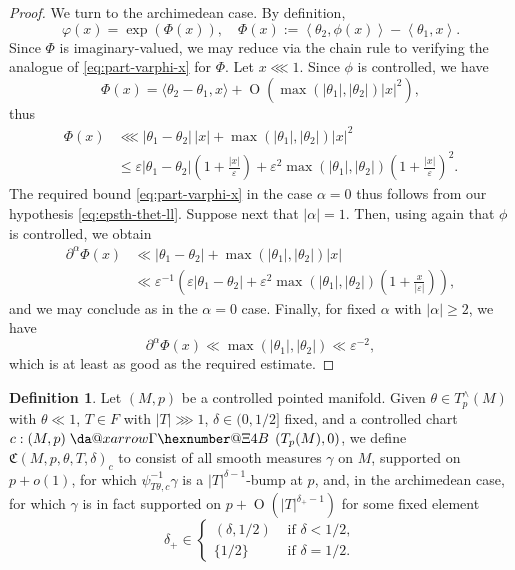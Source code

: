 \documentclass[reqno]{amsart}
\makeatletter
\newcommand*{\da@rightarrow}{\mathchar"0\hexnumber@\symAMSa 4B }
\newcommand*{\xdashrightarrow}[2][]{%
  \mathrel{%
    \mathpalette{\da@xarrow{#1}{#2}{}\da@rightarrow{\,}{}}{}%
  }%
}
\newcommand*{\da@xarrow}[7]{%
  \sbox0{$\ifx#7\scriptstyle\scriptscriptstyle\else\scriptstyle\fi#5#1#6\m@th$}%
  \sbox2{$\ifx#7\scriptstyle\scriptscriptstyle\else\scriptstyle\fi#5#2#6\m@th$}%
  \sbox4{$#7\dabar@\m@th$}%
  \dimen@=\wd0 %
  \ifdim\wd2 >\dimen@
    \dimen@=\wd2 %
  \fi
  \count@=2 %
  \def\da@bars{\dabar@\dabar@}%
  \@whiledim\count@\wd4<\dimen@\do{%
    \advance\count@\@ne
    \expandafter\def\expandafter\da@bars\expandafter{%
      \da@bars
      \dabar@ 
    }%
  }%
  \mathrel{#3}%
  \mathrel{%
    \mathop{\da@bars}\limits
    \ifx\\#1\\%
    \else
      _{\copy0}%
    \fi
    \ifx\\#2\\%
    \else
      ^{\copy2}%
    \fi
  }%
  \mathrel{#4}%
}
\def\eps{\varepsilon}
\def\O{\operatorname{O}}
\theoremstyle{plain} \newtheorem{theorem} {Theorem}
\theoremstyle{definition} \newtheorem{definition} [theorem] {Definition}
\theoremstyle{itplain} %
\numberwithin{equation}{section}
\numberwithin{theorem}{section}
\renewcommand{\geq}{\geqslant}
\renewcommand{\leq}{\leqslant}
\makeatother
\begin{document}
\begin{proof}
  We turn to the archimedean case.  By definition,
  \begin{equation*}
    \varphi(x) = \exp(\Phi(x)), \quad
    \Phi(x) := \left\langle \theta_2, \phi(x) \right\rangle - \left\langle \theta_1, x \right\rangle.
  \end{equation*}
  Since $\Phi$ is imaginary-valued, we may reduce via the chain rule to verifying the analogue of \eqref{eq:part-varphi-x} for $\Phi$.  Let $x \lll 1$.  Since $\phi$ is controlled, we have
  \begin{equation*}
    \Phi(x) = \langle \theta_2 - \theta_1, x \rangle + \O(\max(|\theta_1|,|\theta_2|) |x|^2),
  \end{equation*}
  thus
  \begin{align*}
    \Phi(x)
    &\lll
    | \theta_1 - \theta_2| \, |x| +
    \max(|\theta_1|, |\theta_2|) |x|^2 \\
    &\leq
    \eps | \theta_1 - \theta_2|  \left( 1 + \frac{|x|}{\eps } \right)
    +
    \eps^2 \max(|\theta_1|, |\theta_2|)
      \left( 1 + \frac{|x|}{\eps } \right)^2.
  \end{align*}
  The required bound \eqref{eq:part-varphi-x} in the case $\alpha = 0$ thus follows from our hypothesis \eqref {eq:epsth-thet-ll}.  Suppose next that $|\alpha| = 1$.  Then, using again that $\phi$ is controlled, we obtain
  \begin{align*}
    \partial^\alpha \Phi(x)
    &\ll |\theta_1 - \theta_2| + \max(|\theta_1|,|\theta_2|) |x| \\
    &\ll \eps^{-1} \left(
       \eps |\theta_1 - \theta_2| +
      \eps^2 \max(|\theta_1|,|\theta_2|) \left( 1 + \frac{x}{|\eps|} \right) \right),
  \end{align*}
  and we may conclude as in the $\alpha = 0$ case.  Finally, for fixed $\alpha$ with $|\alpha| \geq 2$, we have
  \begin{equation*}
    \partial^\alpha \Phi(x)
    \ll \max(|\theta_1|, |\theta_2|) \ll \eps^{-2},
  \end{equation*}
  which is at least as good as the required estimate.
\end{proof}


\begin{definition}\label{defn:standard:let-v-be}
  Let $(M,p)$ be a controlled pointed manifold.  Given $\theta \in T_p^\wedge(M)$ with $\theta \ll 1$, $T \in F$ with $|T| \ggg 1$, $\delta \in (0,1/2]$ fixed, and a controlled chart $c : (M,p) \xdashrightarrow{} (T_p(M),0)$, we define $\mathfrak{C}(M,p,\theta,T,\delta)_c$ to consist of all smooth measures $\gamma$ on $M$, supported on $p + o(1)$, for which $\psi_{T \theta,c}^{-1} \gamma$ is a $|T|^{\delta-1}$-bump at $p$, and, in the archimedean case, for which $\gamma$ is in fact supported on $p + \O(|T|^{\delta_+-1})$ for some fixed element
  \begin{equation}\label{eq:delt-in-beginc-1}
  \delta_+ \in \begin{cases}
    (\delta,1/2) & \text{ if } \delta < 1/2, \\
    \{1/2\} & \text{ if } \delta = 1/2.
  \end{cases}
\end{equation}
\end{definition}
\end{document}
